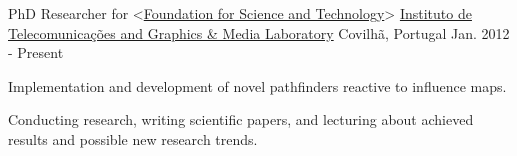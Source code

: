 

\begin{cventries}

  \cventry
    {PhD Researcher for <\href{http://www.fct.pt/index.phtml.en}{Foundation for Science and Technology}>} %
    {\href{http://www.it.ubi.pt/medialab}{Instituto de Telecomunica\c{c}\~{o}es and Graphics \& Media Laboratory}} %
    {Covilh\~a, Portugal} %
    {Jan. 2012 - Present} %
    {
      \begin{cvitems} %
      \item {Implementation and development of novel pathfinders reactive to influence maps.}%
      \item {Conducting research, writing scientific papers, and lecturing about achieved results and possible new research trends.}
      \end{cvitems}
    }  
    

\end{cventries}
